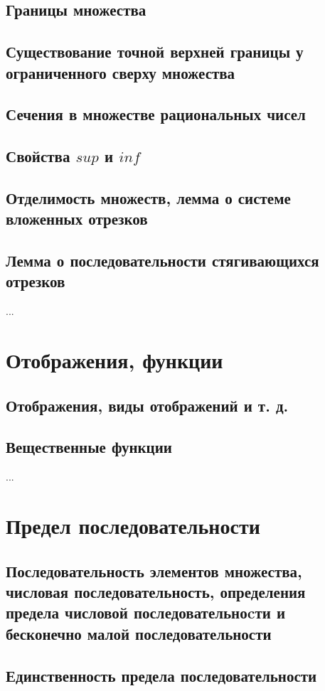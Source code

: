 \subsection{Границы множества}
\subsection{Существование точной верхней границы у ограниченного сверху множества}
\subsection{Сечения в множестве рациональных чисел}
\subsection{Свойства $sup$ и $inf$}
\subsection{Отделимость множеств, лемма о системе вложенных отрезков}
\subsection{Лемма о последовательности стягивающихся отрезков}
...

\section{Отображения, функции}
\subsection{Отображения, виды отображений и т. д.}
\subsection{Вещественные функции}
...

\section{Предел последовательности}
\subsection{Последовательность элементов множества, числовая последовательность, определения предела числовой последовательноcти и бесконечно малой последовательности}
\subsection{Единственность предела последовательности}

